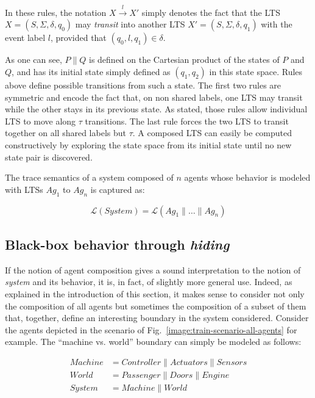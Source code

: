 In these rules, the notation $X \stackrel{l}{\longrightarrow} X'$ simply denotes the fact that the LTS $X = (S,\Sigma,\delta,q_0)$ may \emph{transit} into another LTS $X' = (S,\Sigma,\delta,q_1)$ with the event label $l$, provided that $(q_0,l,q_1) \in \delta$. 

As one can see, $P \parallel Q$ is defined on the Cartesian product of the states of $P$ and $Q$, and has its initial state simply defined as $(q_1,q_2)$ in this state space. Rules above define possible transitions from such a state. The first two rules are symmetric and encode the fact that, on non shared labels, one LTS may transit while the other stays in its previous state. As stated, those rules allow individual LTS to move along $\tau$ transitions. The last rule forces the two LTS to transit together on all shared labels but $\tau$. A composed LTS can easily be computed constructively by exploring the state space from its initial state until no new state pair is discovered. 

The trace semantics of a system composed of $n$ agents whose behavior is modeled with LTSs $Ag_1$ to $Ag_n$ is captured as:

\begin{equation}
\mathcal{L}(System) = \mathcal{L}(Ag_1 \parallel \ldots \parallel Ag_n)
\label{equation:system-composition}
\end{equation}

\subsection{Black-box behavior through \emph{hiding}}

If the notion of agent composition gives a sound interpretation to the notion of \emph{system} and its behavior, it is, in fact, of slightly more general use. Indeed, as explained in the introduction of this section, it makes sense to consider not only the composition of all agents but sometimes the composition of a subset of them that, together, define an interesting boundary in the system considered. Consider the agents depicted in the scenario of Fig.~\ref{image:train-scenario-all-agents} for example. The ``machine vs. world'' boundary can simply be modeled as follows:

\vspace{-0.8cm}
\begin{align*}
Machine &= Controller \parallel Actuators \parallel Sensors \\
World   &= Passenger \parallel Doors \parallel Engine \\
System  &= Machine \parallel World
\end{align*}
\vspace{-0.8cm}

